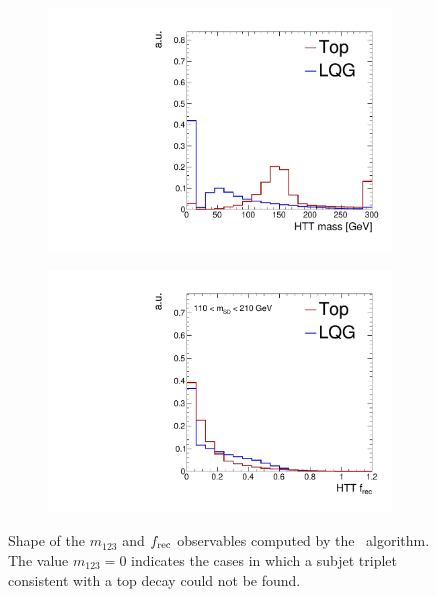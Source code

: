 \begin{figure}[]
    \begin{center}
        \begin{subfigure}[t]{0.35\textwidth}
            \includegraphics[width=\textwidth]{figures/toptagging/shapes/incl_fjHTTMass.pdf}
        \end{subfigure}
        \begin{subfigure}[t]{0.35\textwidth}
            \includegraphics[width=\textwidth]{figures/toptagging/shapes/mass_fjHTTFRec.pdf}
        \end{subfigure}
        \caption{Shape of the $m_{123}$ and $f_\mathrm{rec}$ observables computed by the \HTT~algorithm. 
                 The value $m_{123} = 0$ indicates the cases in which a subjet triplet consistent with a top decay could not be found. }
        \label{fig:jets:htt}
    \end{center}
\end{figure}

